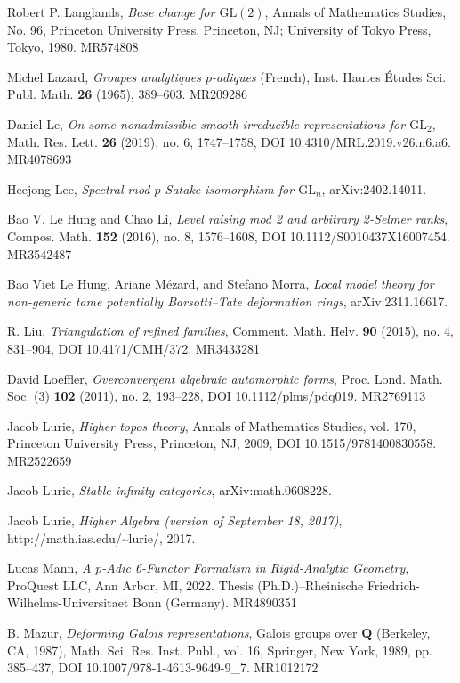 \item[{[Lan80]}] Robert P. Langlands, \emph{Base change for $\mathrm{GL}(2)$}, Annals of Mathematics Studies, No. 96, Princeton University Press, Princeton, NJ; University of Tokyo Press, Tokyo, 1980. MR574808
\item[{[Laz65]}] Michel Lazard, \emph{Groupes analytiques $p$-adiques} (French), Inst. Hautes \'Etudes Sci. Publ. Math. \textbf{26} (1965), 389--603. MR209286
\item[{[Le19]}] Daniel Le, \emph{On some nonadmissible smooth irreducible representations for $\mathrm{GL}_2$}, Math. Res. Lett. \textbf{26} (2019), no. 6, 1747--1758, DOI 10.4310/MRL.2019.v26.n6.a6. MR4078693
\item[{[Lee24]}] Heejong Lee, \emph{Spectral mod $p$ Satake isomorphism for $\mathrm{GL}_n$}, arXiv:2402.14011.
\item[{[LHL16]}] Bao V. Le Hung and Chao Li, \emph{Level raising mod 2 and arbitrary 2-Selmer ranks}, Compos. Math. \textbf{152} (2016), no. 8, 1576--1608, DOI 10.1112/S0010437X16007454. MR3542487
\item[{[LHMM24]}] Bao Viet Le Hung, Ariane M\'ezard, and Stefano Morra, \emph{Local model theory for non-generic tame potentially Barsotti--Tate deformation rings}, arXiv:2311.16617.
\item[{[Liu15]}] R. Liu, \emph{Triangulation of refined families}, Comment. Math. Helv. \textbf{90} (2015), no. 4, 831--904, DOI 10.4171/CMH/372. MR3433281
\item[{[Loe11]}] David Loeffler, \emph{Overconvergent algebraic automorphic forms}, Proc. Lond. Math. Soc. (3) \textbf{102} (2011), no. 2, 193--228, DOI 10.1112/plms/pdq019. MR2769113
\item[{[Lur09a]}] Jacob Lurie, \emph{Higher topos theory}, Annals of Mathematics Studies, vol. 170, Princeton University Press, Princeton, NJ, 2009, DOI 10.1515/9781400830558. MR2522659
\item[{[Lur09b]}] Jacob Lurie, \emph{Stable infinity categories}, arXiv:math.0608228.
\item[{[Lur17]}] Jacob Lurie, \emph{Higher Algebra (version of September 18, 2017)}, http://math.ias.edu/\textasciitilde lurie/, 2017.
\item[{[Man22]}] Lucas Mann, \emph{A $p$-Adic 6-Functor Formalism in Rigid-Analytic Geometry}, ProQuest LLC, Ann Arbor, MI, 2022. Thesis (Ph.D.)--Rheinische Friedrich-Wilhelms-Universitaet Bonn (Germany). MR4890351
\item[{[Maz89]}] B. Mazur, \emph{Deforming Galois representations}, Galois groups over $\mathbf{Q}$ (Berkeley, CA, 1987), Math. Sci. Res. Inst. Publ., vol. 16, Springer, New York, 1989, pp. 385--437, DOI 10.1007/978-1-4613-9649-9\_7. MR1012172
